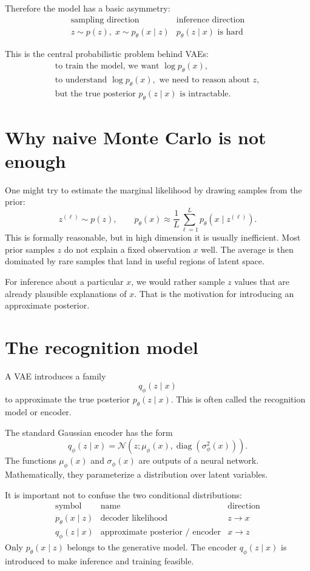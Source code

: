 Therefore the model has a basic asymmetry:
\[
\begin{array}{c|c}
\text{sampling direction} & \text{inference direction}\\
\hline
z\sim p(z),\;x\sim p_\theta(x\mid z) & p_\theta(z\mid x)\text{ is hard}
\end{array}
\]

This is the central probabilistic problem behind VAEs:
\[
\begin{array}{c}
  \text{to train the model, we want }\log p_\theta(x),\\
  \text{to understand }\log p_\theta(x),\text{ we need to reason about }z,\\
  \text{but the true posterior }p_\theta(z\mid x)\text{ is intractable.}
\end{array}
\]

\section{Why naive Monte Carlo is not enough}

One might try to estimate the marginal likelihood by drawing samples from the prior:
\[
  z^{(\ell)}\sim p(z),\qquad
  p_\theta(x)\approx\frac1L\sum_{\ell=1}^L p_\theta(x\mid z^{(\ell)}).
\]
This is formally reasonable, but in high dimension it is usually inefficient.  Most prior samples \(z\) do not explain a fixed observation \(x\) well.  The average is then dominated by rare samples that land in useful regions of latent space.

For inference about a particular \(x\), we would rather sample \(z\) values that are already plausible explanations of \(x\).  That is the motivation for introducing an approximate posterior.

\section{The recognition model}

A VAE introduces a family
\[
  q_\phi(z\mid x)
\]
to approximate the true posterior \(p_\theta(z\mid x)\).  This is often called the recognition model or encoder.

The standard Gaussian encoder has the form
\[
  q_\phi(z\mid x)=\mathcal N(z;\mu_\phi(x),\operatorname{diag}(\sigma_\phi^2(x))).
\]
The functions \(\mu_\phi(x)\) and \(\sigma_\phi(x)\) are outputs of a neural network.  Mathematically, they parameterize a distribution over latent variables.

It is important not to confuse the two conditional distributions:
\[
\begin{array}{c|c|c}
\text{symbol} & \text{name} & \text{direction}\\
\hline
p_\theta(x\mid z) & \text{decoder likelihood} & z\to x\\
q_\phi(z\mid x) & \text{approximate posterior / encoder} & x\to z
\end{array}
\]
Only \(p_\theta(x\mid z)\) belongs to the generative model.  The encoder \(q_\phi(z\mid x)\) is introduced to make inference and training feasible.

